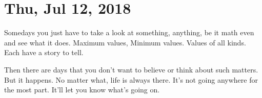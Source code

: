 \section{Thu, Jul 12, 2018}



Somedays you just have to take a look at something, anything, be it math even
and see what it does. Maximum values, Minimum values. Values of all kinds. Each
have a story to tell.

Then there are days that you don't want to believe or think about such matters.
But it happens. No matter what, life is always there. It's not going anywhere
for the most part. It'll let you know what's going on.